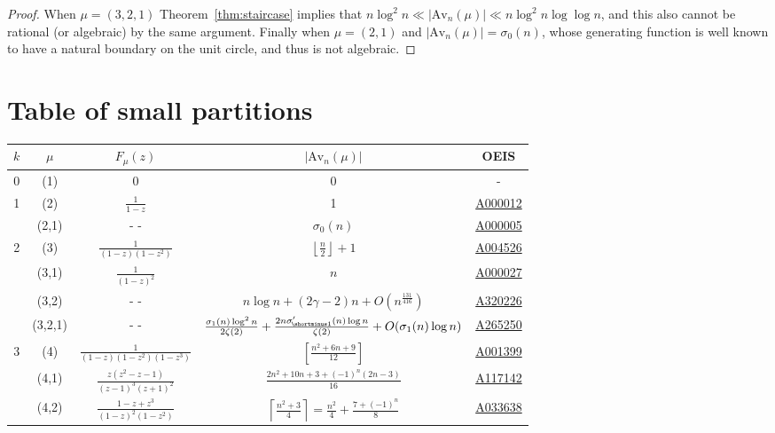 \documentclass{article}
\theoremstyle{plain}
\theoremstyle{definition}
\newcommand{\Av}{\text{Av}}
\begin{document}
\begin{proof}
When $\mu=(3,2,1)$ Theorem~\ref{thm:staircase} implies that $n\log^2 n \ll |\Av_n(\mu)| \ll n\log^2 n \log \log n$, and this also cannot be rational (or algebraic) by the same argument.  Finally when $\mu=(2,1)$ and $|\Av_n(\mu)|=\sigma_0(n)$, whose generating function is well known to have a natural boundary on the unit circle, and thus is not algebraic.

\end{proof}



\section*{Table of small partitions}
\begin{table}[!h]
    \centering
    \begin{tabular}{|c|c|c|c|c|}
    \hline
        $k$ & $\mu$ & $F_\mu(z)$ & $|\Av_n(\mu)|$ & OEIS \\
        \hline
        0 & (1) & 0 & 0 & - \\
        1 & (2) & $\frac{1}{1-z}$ & 1 & \href{http://oeis.org/A000012}{A000012}\\
          & (2,1) & - - & $\sigma_0(n)$ & \href{http://oeis.org/A000005}{A000005}\\
        2 & (3) & $\frac{1}{(1-z)(1-z^2)}$& $\left\lfloor\frac{n}{2}\right\rfloor+1$  & \href{http://oeis.org/A004526}{A004526}\\
          & (3,1) & $\frac{1}{(1-z)^2} $ & $n$ & \href{http://oeis.org/A000027}{A000027}\\
          & (3,2) & - -  & $n \log n +(2\gamma{-}2)n +O\left(n^{\frac{131}{416}}\right)$ &  \href{http://oeis.org/A320226}{A320226}\\
          & (3,2,1) & - -  &  $\frac{\sigma_{1}(n)\log^2 n}{2\zeta(2)}  +\frac{2n\sigma_{\hspace{-0.3mm}\shortminus 1}'(n)\log n }{\zeta(2)} + O(\sigma_1(n)\log n)$ & \href{http://oeis.org/A265250}{A265250} \\
        3  & (4) & $\frac{1}{(1-z)(1-z^2)(1-z^3)}$ & $\left[\frac{n^2+6n+9}{12}\right]$ & \href{http://oeis.org/A001399}{A001399}\\
          &  (4,1) & $\frac{z(z^2 - z - 1)}{(z - 1)^3(z + 1)^2}$& $\frac{2n^2 + 10n + 3 + (-1)^n (2n - 3)}{16}$&\href{http://oeis.org/A117142}{A117142} \\
          &  (4,2) & $\frac{1-z+z^3}{(1-z)^2(1-z^2)}$ & $\left\lceil\frac{n^2+3}{4}\right\rceil = \frac{n^2}{4} + \frac{7 + (-1)^n}{8}$ & \href{http://oeis.org/A033638}{A033638}\\

\end{tabular}
\end{table}
\end{document}
